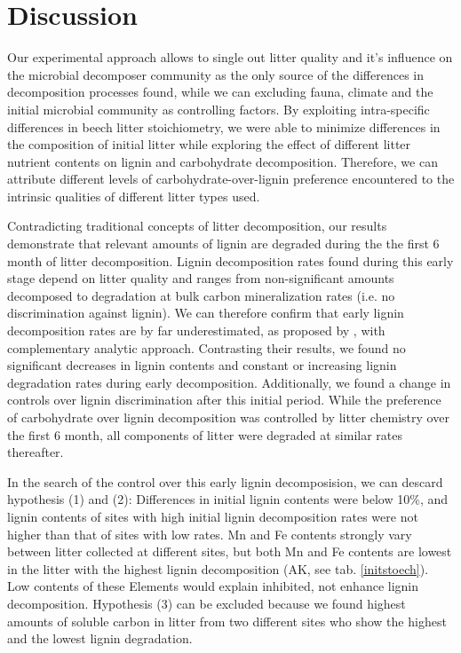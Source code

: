 \documentclass[authoryear,preprint,review,12pt]{elsarticle}
\begin{document}
\section{Discussion}

Our experimental approach allows to single out litter quality and it's influence on the microbial decomposer community as the only source of the differences in decomposition processes found, while we can excluding fauna, climate and the initial microbial community as controlling factors. By exploiting intra-specific differences in beech litter stoichiometry, we were able to minimize differences in the composition of initial litter while exploring the effect of different litter nutrient contents on lignin and carbohydrate decomposition. Therefore, we can attribute different levels of carbohydrate-over-lignin preference encountered to the intrinsic qualities of different litter types used.

Contradicting traditional concepts of litter decomposition, our results demonstrate that relevant amounts of lignin are degraded during the the first 6 month of litter decomposition. Lignin decomposition rates found during this early stage depend on litter quality and ranges from non-significant amounts decomposed to degradation at bulk carbon mineralization rates (i.e. no discrimination against lignin). We can therefore confirm that early lignin decomposition rates are by far underestimated, as proposed by \cite{Klotzbucher2011}, with complementary analytic approach. Contrasting their results, we found no significant decreases in lignin contents and constant or increasing lignin degradation rates during early decomposition. Additionally, we found a change in controls over lignin discrimination after this initial period. While the preference of carbohydrate over lignin decomposition was controlled by litter chemistry over the first 6 month, all components of litter were degraded at similar rates thereafter.

In the search of the control over this early lignin decomposision, we can descard hypothesis (1) and (2): Differences in initial lignin contents were below 10\%, and lignin contents of sites with high initial lignin decomposition rates were not higher than that of sites with low rates. Mn and Fe contents strongly vary between litter collected at different sites, but both Mn and Fe contents are lowest in the litter with the highest lignin decomposition (AK, see tab. \ref{initstoech}). Low contents of these Elements would explain inhibited, not enhance lignin decomposition. Hypothesis (3) can be excluded because we found highest amounts of soluble carbon in litter from two different sites who show the highest and the lowest lignin degradation.
\end{document}
